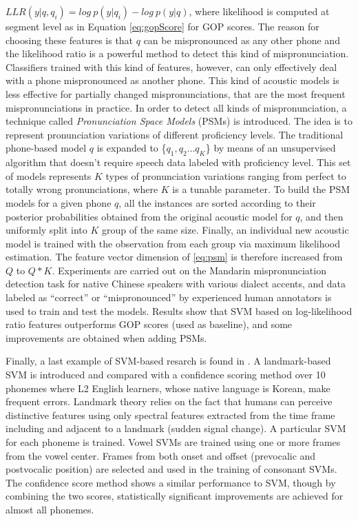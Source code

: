 $LLR(y|q,q_{i})=log \ p(y|q_{i}) - log \ p(y|q)$, where likelihood is computed at segment
level as in Equation \ref{eq:gopScore} for GOP scores. The reason for choosing these features is
that $q$ can be mispronounced as any other phone and the likelihood ratio is a powerful
method to detect this kind of mispronunciation. Classifiers trained with this kind of features, however,
can only effectively deal with a phone mispronounced as another phone. This kind of acoustic models is
less effective for partially changed mispronunciations, that are the most frequent mispronunciations
in practice. In order to detect all kinds of mispronunciation, a technique called
\textit{Pronunciation Space Models} (PSMs) is introduced. The idea is to represent pronunciation variations
of different proficiency levels. The traditional phone-based model $q$ is expanded to
\{$q_{1}, q_{2} \dotsc q_{K}$\} by means of an unsupervised algorithm that doesn't require
speech data labeled with proficiency level.
This set of models represents $K$ types of pronunciation variations ranging from perfect to
totally wrong pronunciations, where $K$ is a tunable parameter. To build the PSM models for a
given phone $q$, all the instances are sorted according to their
posterior probabilities obtained from the original acoustic model for $q$, and
then uniformly split into $K$ group of the same size. Finally, an individual new acoustic
model is trained with the observation from each group via maximum likelihood estimation.
The feature vector dimension of \ref{eq:psm} is therefore increased from $Q$ to $Q*K$.
Experiments are carried out on the
Mandarin mispronunciation detection task for native Chinese speakers with various dialect accents,
and data labeled as ``correct'' or ``mispronounced'' by experienced human annotators is used to train and test the models.
Results show that SVM based on log-likelihood ratio features outperforms GOP scores (used as baseline), and some
improvements are obtained when adding PSMs.

Finally, a last example of SVM-based resarch is found in \cite{landmark_svm, landmark_svm_2}.
A landmark-based SVM is introduced and compared with a confidence
scoring method over 10 phonemes where
L2 English learners, whose native language is Korean, make frequent errors.
Landmark theory relies on the fact that humans can perceive distinctive
features using only spectral features extracted from the time frame including and adjacent to
a landmark (sudden signal change). A particular SVM for each phoneme is trained. Vowel SVMs are
trained using one or more frames from the vowel center. Frames from both onset and offset
(prevocalic and postvocalic position) are selected and used in the training of consonant
SVMs. The confidence score method shows a similar performance to SVM, though by combining
the two scores, statistically significant improvements are achieved for almost all phonemes.

